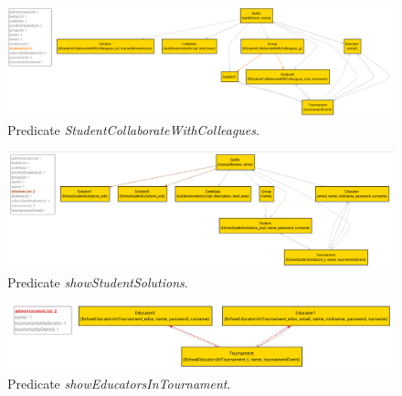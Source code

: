 \documentclass[../RASD.tex]{subfiles}
\begin{document}
\newpage

\begin{figure}[h!]
    \centering
    \includegraphics[width=1.2\textwidth, angle=90]{../assets/section_4/StudentCollaborateWithColleagues.png}
    \caption{Predicate \textit{StudentCollaborateWithColleagues}.}
    \label{img:alloy_student_collaborate_with_colleagues}
\end{figure}

\newpage

\begin{figure}[h!]
    \centering
    \includegraphics[width=1.2\textwidth, angle=90]{../assets/section_4/showStudentSolutions.png}
    \caption{Predicate \textit{showStudentSolutions}.}
    \label{img:alloy_show_student_solutions}
\end{figure}

\newpage

\begin{figure}[h!]
    \centering
    \includegraphics[width=\textwidth]{../assets/section_4/showEducatorsInTournament.png}
    \caption{Predicate \textit{showEducatorsInTournament}.}
    \label{img:alloy_show_educators_in_tournament}
\end{figure}
\newpage
\end{document}
